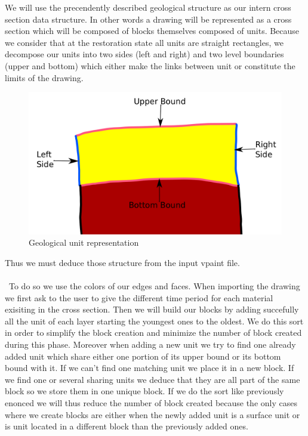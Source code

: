 \documentclass[12pt, a4paper]{memoir} %
\begin{document}
We will use the precendently described geological structure as our intern cross section data structure. In other words a drawing will be represented as a cross section which will be composed of blocks themselves composed of units. Because we consider that at the restoration state all units are straight rectangles, we decompose our units into two sides (left and right) and two level boundaries (upper and bottom) which either make the links between unit or constitute the limits of the drawing. 

 \begin{figure}[H]
	\centering
	\includegraphics[scale=0.3]{unitDescriptionEdit.png}
	\caption{Geological unit representation}
\end{figure}

Thus we must deduce those structure from the input vpaint file. \\\\\
To do so we use the colors of our edges and faces. When importing the drawing we first ask to the user to give the different time period for each material exisiting in the cross section. Then we will build our blocks by adding succefully all the unit of each layer starting the youngest ones to the oldest. We do this sort in order to simplify the block creation and minimize the number of block created during this phase. Moreover when adding a new unit we try to find one already added unit which share either one portion of its upper bound  or its bottom bound with it. If we can't find one matching unit we place it in a new block. If we find one or several sharing units we deduce that they are all part of the same block so we store them in one unique block. If we do the sort like previously enonced we will thus reduce the number of block created because the only cases where we create blocks are either when the newly added unit is a surface unit or is unit located in a different block than the previously added ones.\\\\
\end{document}
